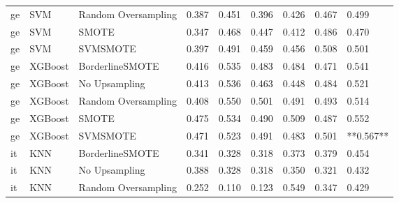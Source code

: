 \begin{tabular}{lllllllll}
      ge &                          SVM & Random Oversampling & 0.387 &                     0.451 &                 0.396 &                  0.426 &                                   0.467 &     0.499 \\
      ge &                          SVM &               SMOTE & 0.347 &                     0.468 &                 0.447 &                  0.412 &                                   0.486 &     0.470 \\
      ge &                          SVM &            SVMSMOTE & 0.397 &                     0.491 &                 0.459 &                  0.456 &                                   0.508 &     0.501 \\
      ge &                      XGBoost &     BorderlineSMOTE & 0.416 &                     0.535 &                 0.483 &                  0.484 &                                   0.471 &     0.541 \\
      ge &                      XGBoost &       No Upsampling & 0.413 &                     0.536 &                 0.463 &                  0.448 &                                   0.484 &     0.521 \\
      ge &                      XGBoost & Random Oversampling & 0.408 &                     0.550 &                 0.501 &                  0.491 &                                   0.493 &     0.514 \\
      ge &                      XGBoost &               SMOTE & 0.475 &                     0.534 &                 0.490 &                  0.509 &                                   0.487 &     0.552 \\
      ge &                      XGBoost &            SVMSMOTE & 0.471 &                     0.523 &                 0.491 &                  0.483 &                                   0.501 & **0.567** \\
      it &                          KNN &     BorderlineSMOTE & 0.341 &                     0.328 &                 0.318 &                  0.373 &                                   0.379 &     0.454 \\
      it &                          KNN &       No Upsampling & 0.388 &                     0.328 &                 0.318 &                  0.350 &                                   0.321 &     0.432 \\
      it &                          KNN & Random Oversampling & 0.252 &                     0.110 &                 0.123 &                  0.549 &                                   0.347 &     0.429 \\

\end{tabular}
